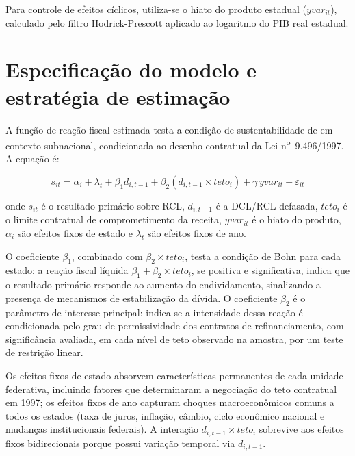 Para controle de efeitos cíclicos, utiliza-se o hiato do produto estadual ($yvar_{it}$), calculado pelo filtro Hodrick-Prescott aplicado ao logaritmo do PIB real estadual.

\section{Especificação do modelo e estratégia de estimação}
\label{sec:especificacao}

A função de reação fiscal estimada testa a condição de sustentabilidade de  em contexto subnacional, condicionada ao desenho contratual da Lei n\textsuperscript{o}~9.496/1997. A equação é:
  
  \begin{equation}
s_{it} = \alpha_i + \lambda_t + \beta_1 d_{i,t-1} + \beta_2 (d_{i,t-1} \times teto_i) + \gamma \, yvar_{it} + \varepsilon_{it}
\label{eq:modelo}
\end{equation}

\noindent onde $s_{it}$ é o resultado primário sobre RCL, $d_{i,t-1}$ é a DCL/RCL defasada, $teto_i$ é o limite contratual de comprometimento da receita, $yvar_{it}$ é o hiato do produto, $\alpha_i$ são efeitos fixos de estado e $\lambda_t$ são efeitos fixos de ano.

O coeficiente $\beta_1$, combinado com $\beta_2 \times teto_i$, testa a condição de Bohn para cada estado: a reação fiscal líquida $\beta_1 + \beta_2 \times teto_i$, se positiva e significativa, indica que o resultado primário responde ao aumento do endividamento, sinalizando a presença de mecanismos de estabilização da dívida. O coeficiente $\beta_2$ é o parâmetro de interesse principal: indica se a intensidade dessa reação é condicionada pelo grau de permissividade dos contratos de refinanciamento, com significância avaliada, em cada nível de teto observado na amostra, por um teste de restrição linear.

Os efeitos fixos de estado absorvem características permanentes de cada unidade federativa, incluindo fatores que determinaram a negociação do teto contratual em 1997; os efeitos fixos de ano capturam choques macroeconômicos comuns a todos os estados (taxa de juros, inflação, câmbio, ciclo econômico nacional e mudanças institucionais federais). A interação $d_{i,t-1} \times teto_i$ sobrevive aos efeitos fixos bidirecionais porque possui variação temporal via $d_{i,t-1}$.

